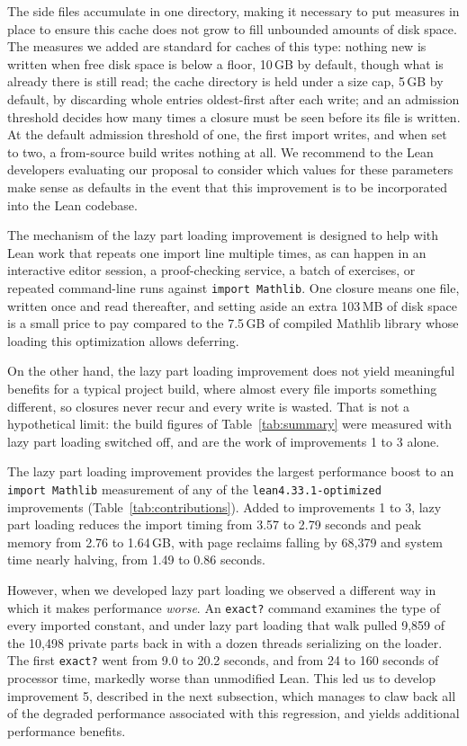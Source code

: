 \documentclass{article}
\newcommand{\Lean}{Lean\xspace}      %
\newcommand{\mathlib}{Mathlib\xspace}
\newcommand{\altlean}{\texttt{lean4.33.1-\allowbreak optimized}\xspace}
\begin{document}
The side files accumulate in one directory, making it necessary to put measures in place to ensure this cache does not grow to fill unbounded amounts of disk space. The measures we added are standard for caches of this type: nothing new is written when free disk space is below a floor, 10\,GB by default, though what is already there is still read; the cache directory is held under a size cap, 5\,GB by default, by discarding whole entries oldest-first after each write; and an admission threshold decides how many times a closure must be seen before its file is written. At the default admission threshold of one, the first import writes, and when set to two, a from-source build writes nothing at all. We recommend to the \Lean developers evaluating our proposal to consider which values for these parameters make sense as defaults in the event that this improvement is to be incorporated into the \Lean codebase.

The mechanism of the lazy part loading improvement is designed to help with \Lean work that repeats one import line multiple times, as can happen in an interactive editor session, a proof-checking service, a batch of exercises, or repeated command-line runs against \texttt{import Mathlib}. One closure means one file, written once and read thereafter, and setting aside an extra 103\,MB of disk space is a small price to pay compared to the 7.5\,GB of compiled \mathlib library whose loading this optimization allows deferring.

On the other hand, the lazy part loading improvement does not yield meaningful benefits for a typical project build, where almost every file imports something different, so closures never recur and every write is wasted. That is not a hypothetical limit: the build figures of Table~\ref{tab:summary} were measured with lazy part loading switched off, and are the work of improvements 1 to 3 alone.

The lazy part loading improvement provides the largest performance boost to an \texttt{import Mathlib} measurement of any of the \altlean improvements (Table~\ref{tab:contributions}). Added to improvements 1 to 3, lazy part loading reduces the import timing from 3.57 to 2.79 seconds and peak memory from 2.76 to 1.64\,GB, with page reclaims falling by 68{,}379 and system time nearly halving, from 1.49 to 0.86 seconds.

However, when we developed lazy part loading we observed a different way in which it makes performance \emph{worse}. An \texttt{exact?} command examines the type of every imported constant, and under lazy part loading that walk pulled 9{,}859 of the 10{,}498 private parts back in 
with a dozen threads serializing on the loader. The first \texttt{exact?} went from 9.0 to 20.2 seconds, and from 24 to 160 seconds of processor time, markedly worse than unmodified \Lean. This led us to develop improvement 5, described in the next subsection, which manages to claw back all of the degraded performance associated with this regression, and yields additional performance benefits.
\end{document}
